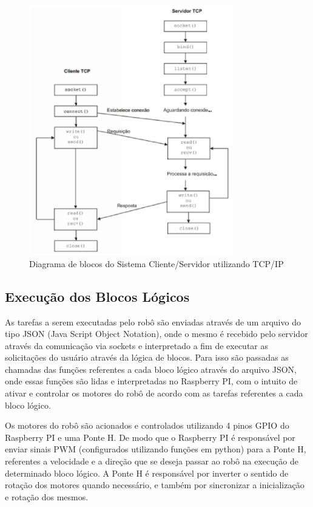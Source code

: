 \begin{figure}[H]
    \centering
    \includegraphics[width=0.8\textwidth]{figuras/diagrama_socket.eps}
    \caption{Diagrama de blocos do Sistema Cliente/Servidor utilizando TCP/IP}
    \label{fig:diagrama_socket}
\end{figure}

\subsection{Execução dos Blocos Lógicos}

As tarefas a serem executadas pelo robô são enviadas através de um arquivo do tipo JSON (Java Script Object Notation), onde o mesmo é
recebido pelo servidor através da comunicação via sockets e interpretado a fim de executar as solicitações do usuário através da lógica
de blocos. Para isso são passadas as chamadas das funções referentes a cada bloco lógico através do arquivo JSON, onde essas funções são
lidas e interpretadas no Raspberry PI, com o intuito de ativar e controlar os motores do robô de acordo com as tarefas referentes a cada
bloco lógico.

Os motores do robô são acionados e controlados utilizando 4 pinos GPIO do Raspberry PI e uma Ponte H. De modo que o Raspberry PI é responsável
por enviar sinais PWM (configurados utilizando funções em python) para a Ponte H, referentes a velocidade e a direção que se deseja passar ao
robô na execução de determinado bloco lógico. A Ponte H é responsável por inverter o sentido de rotação dos motores quando necessário, e
também por sincronizar a inicialização e rotação dos mesmos.

